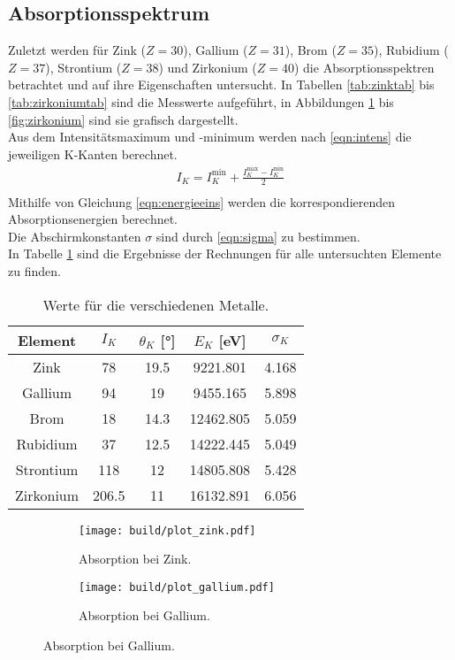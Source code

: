 \subsection{Absorptionsspektrum}
  Zuletzt werden für Zink ($Z = 30$), Gallium ($Z = 31$), Brom ($Z = 35$), Rubidium ($Z = 37$), Strontium ($Z = 38$) und Zirkonium ($Z = 40$) die Absorptionsspektren betrachtet und auf ihre
  Eigenschaften untersucht. In Tabellen \ref{tab:zinktab} bis \ref{tab:zirkoniumtab} sind die Messwerte aufgeführt, in 
  Abbildungen \ref{fig:zink} bis \ref{fig:zirkonium} sind sie grafisch dargestellt.\\
  Aus dem Intensitätsmaximum und -minimum werden nach \eqref{eqn:intens} die jeweiligen K-Kanten berechnet.
  \begin{align}
    I_K = I_K^{\text{min}} + \frac{I_K^{\text{max}} - I_K^{\text{min}}}{2}\\
    \label{eqn:intens}
  \end{align}
  Mithilfe von Gleichung \eqref{eqn:energieeins}
  werden die korrespondierenden Absorptionsenergien berechnet. \\
  Die Abschirmkonstanten $\sigma$ sind durch \eqref{eqn:sigma}
  zu bestimmen.\\
  In Tabelle \ref{tab:results} sind die Ergebnisse der Rechnungen für alle untersuchten Elemente zu finden.

  \begin{table}
    \centering
    \caption{Werte für die verschiedenen Metalle.}
    \label{tab:results}
    \begin{tabular}{c c c c c}
      \toprule
      Element & $I_K$ & $\theta_K$ [°] & $E_K$ [eV]& $\sigma_K$ \\
      \midrule
      Zink & 78 & 19.5 & 9221.801 & 4.168 \\
      Gallium & 94 & 19 & 9455.165 & 5.898 \\
      Brom & 18 & 14.3 & 12462.805 & 5.059 \\
      Rubidium & 37 & 12.5 & 14222.445 & 5.049 \\
      Strontium & 118 & 12 & 14805.808 & 5.428 \\
      Zirkonium & 206.5 & 11 & 16132.891 & 6.056 \\
      \bottomrule
    \end{tabular}
  \end{table}
  \FloatBarrier

  \begin{figure}
    \centering
    \begin{subfigure}{0.30\textwidth}
      \centering
      \texttt{[image: build/plot\_zink.pdf]}
      \caption{Absorption bei Zink.}
      \label{fig:zink}
    \end{subfigure}
    \hfill
    \begin{subfigure}{0.30\textwidth}
      \centering
      \texttt{[image: build/plot\_gallium.pdf]}
      \caption{Absorption bei Gallium.}
      \label{fig:gallium}
    \end{subfigure}
  \end{figure}

